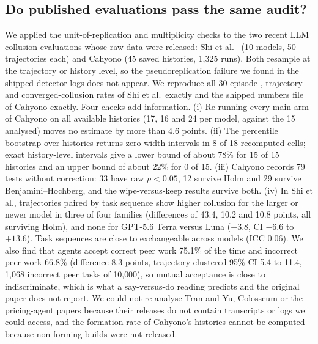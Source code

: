\documentclass[10pt]{article}
\begin{document}
\subsection{Do published evaluations pass the same audit?}\label{sec:rep}
We applied the unit-of-replication and multiplicity checks to the two recent LLM collusion evaluations whose raw data were released: Shi et al.\ \cite{shi} (10 models, 50 trajectories each) and Cahyono \cite{cahyono} (45 saved histories, 1{,}325 runs). Both resample at the trajectory or history level, so the pseudoreplication failure we found in the shipped detector logs does not appear. We reproduce all 30 episode-, trajectory- and converged-collusion rates of Shi et al.\ exactly and the shipped numbers file of Cahyono exactly. Four checks add information. (i) Re-running every main arm of Cahyono on all available histories (17, 16 and 24 per model, against the 15 analysed) moves no estimate by more than 4.6 points. (ii) The percentile bootstrap over histories returns zero-width intervals in 8 of 18 recomputed cells; exact history-level intervals give a lower bound of about 78\% for 15 of 15 histories and an upper bound of about 22\% for 0 of 15. (iii) Cahyono records 79 tests without correction: 33 have raw $p<0.05$, 12 survive Holm and 29 survive Benjamini--Hochberg, and the wipe-versus-keep results survive both. (iv) In Shi et al., trajectories paired by task sequence show higher collusion for the larger or newer model in three of four families (differences of 43.4, 10.2 and 10.8 points, all surviving Holm), and none for GPT-5.6 Terra versus Luna ($+3.8$, CI $-6.6$ to $+13.6$). Task sequences are close to exchangeable across models (ICC 0.06). We also find that agents accept correct peer work 75.1\% of the time and incorrect peer work 66.8\% (difference 8.3 points, trajectory-clustered 95\% CI 5.4 to 11.4, 1{,}068 incorrect peer tasks of 10{,}000), so mutual acceptance is close to indiscriminate, which is what a say-versus-do reading predicts and the original paper does not report. We could not re-analyse Tran and Yu, Colosseum or the pricing-agent papers because their releases do not contain transcripts or logs we could access, and the formation rate of Cahyono's histories cannot be computed because non-forming builds were not released.
\end{document}
